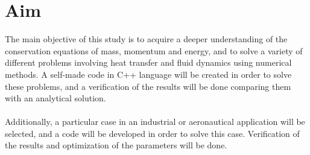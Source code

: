 \section{Aim}
The main objective of this study is to acquire a deeper understanding of the conservation equations of mass, momentum and energy, and to solve a variety of different problems involving heat transfer and fluid dynamics using numerical methods. A self-made code in C++ language will be created in order to solve these problems, and a verification of the results will be done comparing them with an analytical solution.\\
\\
Additionally, a particular case in an industrial or aeronautical application will be selected, and a code will be developed in order to solve this case. Verification of the results and optimization of the parameters will be done.